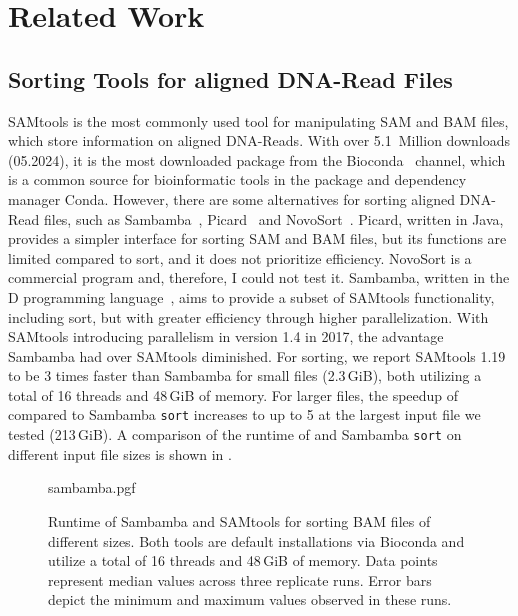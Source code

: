 \section{Related Work}

\subsection{Sorting Tools for aligned DNA-Read Files}
SAMtools is the most commonly used tool for manipulating SAM and BAM files, which store information on aligned DNA-Reads. With over 5.1~Million downloads (05.2024), it is the most downloaded package from the Bioconda~\cite{the_bioconda_team_bioconda_2018} channel, which is a common source for bioinformatic tools in the package and dependency manager Conda. However, there are some alternatives for sorting aligned DNA-Read files, such as Sambamba~\cite{tarasov_sambamba_2015}, Picard~\cite{Picard2019toolkit} and NovoSort~\cite{noauthor_novosort_nodate}. Picard, written in Java, provides a simpler interface for sorting SAM and BAM files, but its functions are limited compared to sort, and it does not prioritize efficiency. NovoSort is a commercial program and, therefore, I could not test it. Sambamba, written in the D programming language~\cite{alexandrescu_d_2010}, aims to provide a subset of SAMtools functionality, including sort, but with greater efficiency through higher parallelization. With SAMtools introducing parallelism in version 1.4 in 2017, the advantage Sambamba had over SAMtools diminished. For sorting, we report SAMtools 1.19 to be 3 times faster than Sambamba for small files (2.3\,GiB), both utilizing a total of 16 threads and 48\,GiB of memory. For larger files, the speedup of \sort compared to Sambamba \texttt{sort} increases to up to 5 at the largest input file we tested (213\,GiB). A comparison of the runtime of \sort and Sambamba \texttt{sort} on different input file sizes is shown in .
\begin{figure}[t]
        {sambamba.pgf}
    \caption{Runtime of Sambamba and SAMtools for sorting BAM files of different sizes. Both tools are default installations via Bioconda and utilize a total of 16 threads and 48\,GiB of memory. Data points represent median values across three replicate runs. Error bars depict the minimum and maximum values observed in these runs.}
    \label{fig:sambamba}
\end{figure}

